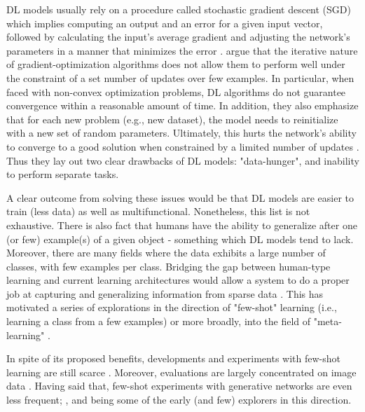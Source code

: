 \documentclass[a4paper]{book}
\begin{document}
DL models usually rely on a procedure called stochastic gradient descent (SGD) which implies computing an output and an error for a given input vector, followed by calculating the input's average gradient and adjusting the network's parameters in a manner that minimizes the error \parencite{lecun_deep_2015}. \textcite{ravi_optimization_2016} argue that the iterative nature of gradient-optimization algorithms does not allow them to perform well under the constraint of a set number of updates over few examples. In particular, when faced with non-convex optimization problems, DL algorithms do not guarantee convergence within a reasonable amount of time. In addition, they also emphasize that for each new problem (e.g., new dataset), the model needs to reinitialize with a new set of random parameters. Ultimately, this hurts the network's ability to converge to a good solution when constrained by a limited number of updates \parencite{ravi_optimization_2016}. Thus they lay out two clear drawbacks of DL models: "data-hunger", and inability to perform separate tasks.

A clear outcome from solving these issues would be that DL models are easier to train (less data) as well as multifunctional. Nonetheless, this list is not exhaustive. There is also fact that humans have the ability to generalize after one (or few) example(s) of a given object \parencite{vinyals_matching_2016, chen_closer_2018, ravi_optimization_2016} - something which DL models tend to lack. Moreover, there are many fields where the data exhibits a large number of classes, with few examples per class. Bridging the gap between human-type learning and current learning architectures would allow a system to do a proper job at capturing and generalizing information from sparse data \parencite{ravi_optimization_2016, larochelle_few-shot_2017}. This has motivated a series of explorations in the direction of "few-shot" learning (i.e., learning a class from a few examples) or more broadly, into the field of "meta-learning" \parencite[learning to learn in hopes of generalizing to new tasks;][]{chen_closer_2018, vinyals_matching_2016, zhang_metagan_2018}.

In spite of its proposed benefits, developments and experiments with few-shot learning are still scarce \parencite{larochelle_few-shot_2017}. Moreover, evaluations are largely concentrated on image data \parencite[see][]{lake_omniglot_2019, clouatre_figr_2019, vinyals_matching_2016, chen_closer_2018, ravi_optimization_2016}. Having said that, few-shot experiments with generative networks are even less frequent; \textcite{clouatre_figr_2019}, \textcite{dong_musegan_2017} and \textcite{zhang_metagan_2018} being some of the early (and few) explorers in this direction.
\end{document}
